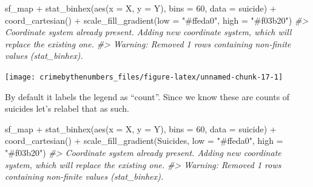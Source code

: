 \documentclass[
]{krantz}
\makeatletter
\newenvironment{Shaded}{\begin{snugshade}}{\end{snugshade}}
\newcommand{\AttributeTok}[1]{\textcolor[rgb]{0.61,0.61,0.61}{#1}}
\newcommand{\CommentTok}[1]{\textcolor[rgb]{0.37,0.37,0.37}{\textit{#1}}}
\newcommand{\DecValTok}[1]{\textcolor[rgb]{0.06,0.06,0.06}{#1}}
\newcommand{\FunctionTok}[1]{\textcolor[rgb]{0,0,0}{#1}}
\newcommand{\NormalTok}[1]{#1}
\newcommand{\SpecialCharTok}[1]{\textcolor[rgb]{0,0,0}{#1}}
\newcommand{\StringTok}[1]{\textcolor[rgb]{0.5,0.5,0.5}{#1}}
\newenvironment{kframe}{%
\medskip{}
\setlength{\fboxsep}{.8em}
 \def\at@end@of@kframe{}%
 \ifinner\ifhmode%
  \def\at@end@of@kframe{\end{minipage}}%
  \begin{minipage}{\columnwidth}%
 \fi\fi%
 \def\FrameCommand##1{\hskip\@totalleftmargin \hskip-\fboxsep
 \colorbox{shadecolor}{##1}\hskip-\fboxsep
     \hskip-\linewidth \hskip-\@totalleftmargin \hskip\columnwidth}%
 \MakeFramed {\advance\hsize-\width
   \@totalleftmargin\z@ \linewidth\hsize
   \@setminipage}}%
 {\par\unskip\endMakeFramed%
 \at@end@of@kframe}
\renewenvironment{Shaded}{\begin{kframe}}{\end{kframe}}
\makeatother
\begin{document}
\begin{Shaded}
\begin{Highlighting}[]
\NormalTok{sf\_map }\SpecialCharTok{+}
  \FunctionTok{stat\_binhex}\NormalTok{(}\FunctionTok{aes}\NormalTok{(}\AttributeTok{x =}\NormalTok{ X, }\AttributeTok{y =}\NormalTok{ Y),}
              \AttributeTok{bins  =} \DecValTok{60}\NormalTok{,}
              \AttributeTok{data =}\NormalTok{ suicide) }\SpecialCharTok{+}
  \FunctionTok{coord\_cartesian}\NormalTok{() }\SpecialCharTok{+}
  \FunctionTok{scale\_fill\_gradient}\NormalTok{(}\AttributeTok{low =} \StringTok{"\#ffeda0"}\NormalTok{,}
                      \AttributeTok{high =} \StringTok{"\#f03b20"}\NormalTok{)}
\CommentTok{\#\textgreater{} Coordinate system already present. Adding new coordinate system, which will replace the existing one.}
\CommentTok{\#\textgreater{} Warning: Removed 1 rows containing non{-}finite values (stat\_binhex).}
\end{Highlighting}
\end{Shaded}

\begin{center}\texttt{[image: crimebythenumbers\_files/figure-latex/unnamed-chunk-17-1]} \end{center}

By default it labels the legend as ``count''. Since we know these are counts of suicides let's relabel that as such.

\begin{Shaded}
\begin{Highlighting}[]
\NormalTok{sf\_map }\SpecialCharTok{+}
  \FunctionTok{stat\_binhex}\NormalTok{(}\FunctionTok{aes}\NormalTok{(}\AttributeTok{x =}\NormalTok{ X, }\AttributeTok{y =}\NormalTok{ Y),}
              \AttributeTok{bins  =} \DecValTok{60}\NormalTok{,}
              \AttributeTok{data =}\NormalTok{ suicide) }\SpecialCharTok{+}
  \FunctionTok{coord\_cartesian}\NormalTok{() }\SpecialCharTok{+}
  \FunctionTok{scale\_fill\_gradient}\NormalTok{(}\StringTok{\textquotesingle{}Suicides\textquotesingle{}}\NormalTok{,}
                      \AttributeTok{low =} \StringTok{"\#ffeda0"}\NormalTok{,}
                      \AttributeTok{high =} \StringTok{"\#f03b20"}\NormalTok{)}
\CommentTok{\#\textgreater{} Coordinate system already present. Adding new coordinate system, which will replace the existing one.}
\CommentTok{\#\textgreater{} Warning: Removed 1 rows containing non{-}finite values (stat\_binhex).}
\end{Highlighting}
\end{Shaded}
\end{document}
